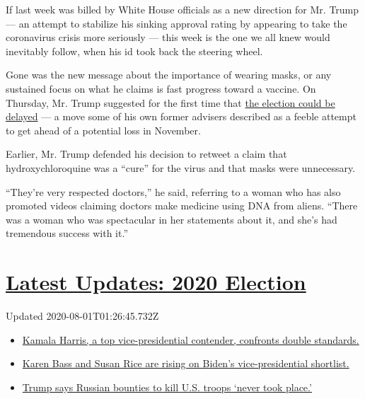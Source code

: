 If last week was billed by White House officials as a new direction for
Mr. Trump --- an attempt to stabilize his sinking approval rating by
appearing to take the coronavirus crisis more seriously --- this week is
the one we all knew would inevitably follow, when his id took back the
steering wheel.

Gone was the new message about the importance of wearing masks, or any
sustained focus on what he claims is fast progress toward a vaccine. On
Thursday, Mr. Trump suggested for the first time that
\href{https://www.nytimes.com/2020/07/30/us/politics/trump-delay-2020-election.html}{the
election could be delayed} --- a move some of his own former advisers
described as a feeble attempt to get ahead of a potential loss in
November.

Earlier, Mr. Trump defended his decision to retweet a claim that
hydroxychloroquine was a ``cure'' for the virus and that masks were
unnecessary.

``They're very respected doctors,'' he said, referring to a woman who
has also promoted videos claiming doctors make medicine using DNA from
aliens. ``There was a woman who was spectacular in her statements about
it, and she's had tremendous success with it.''

\hypertarget{latest-updates-2020-election}{%
\section{\texorpdfstring{\href{https://www.nytimes.com/2020/07/31/us/elections/biden-vs-trump.html?action=click\&pgtype=Article\&state=default\&region=MAIN_CONTENT_1\&context=storylines_live_updates}{Latest
Updates: 2020
Election}}{Latest Updates: 2020 Election}}\label{latest-updates-2020-election}}

Updated 2020-08-01T01:26:45.732Z

\begin{itemize}
\tightlist
\item
  \href{https://www.nytimes.com/2020/07/31/us/elections/biden-vs-trump.html?action=click\&pgtype=Article\&state=default\&region=MAIN_CONTENT_1\&context=storylines_live_updates\#link-29fdff45}{Kamala
  Harris, a top vice-presidential contender, confronts double
  standards.}
\item
  \href{https://www.nytimes.com/2020/07/31/us/elections/biden-vs-trump.html?action=click\&pgtype=Article\&state=default\&region=MAIN_CONTENT_1\&context=storylines_live_updates\#link-13ec3d9c}{Karen
  Bass and Susan Rice are rising on Biden's vice-presidential
  shortlist.}
\item
  \href{https://www.nytimes.com/2020/07/31/us/elections/biden-vs-trump.html?action=click\&pgtype=Article\&state=default\&region=MAIN_CONTENT_1\&context=storylines_live_updates\#link-49e9a016}{Trump
  says Russian bounties to kill U.S. troops `never took place.'}
\end{itemize}

